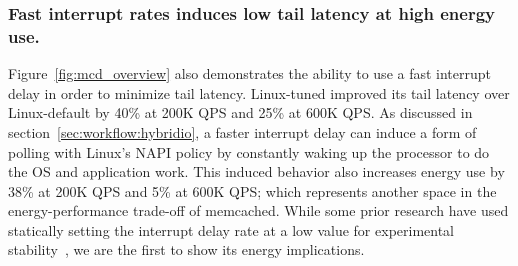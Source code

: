 \subsubsection{Fast interrupt rates induces low tail latency at high energy use.} 
\label{sec:mcd:fastitr} 
Figure~\ref{fig:mcd_overview} also demonstrates the ability to use a fast interrupt delay in order to minimize tail latency. Linux-tuned improved its tail latency over Linux-default by 40\% at 200K QPS and 25\% at 600K QPS. As discussed in section~\ref{sec:workflow:hybridio}, a faster interrupt delay can induce a form of polling with Linux's NAPI policy by constantly waking up the processor to do the OS and application work. This induced behavior also increases energy use by 38\% at 200K QPS and 5\% at 600K QPS; which represents another space in the energy-performance trade-off of memcached. While some prior research have used statically setting the interrupt delay rate at a low value for experimental stability~\cite{10.1145/2812806, 10.5555/3323234.3323265}, we are the first to show its energy implications.





